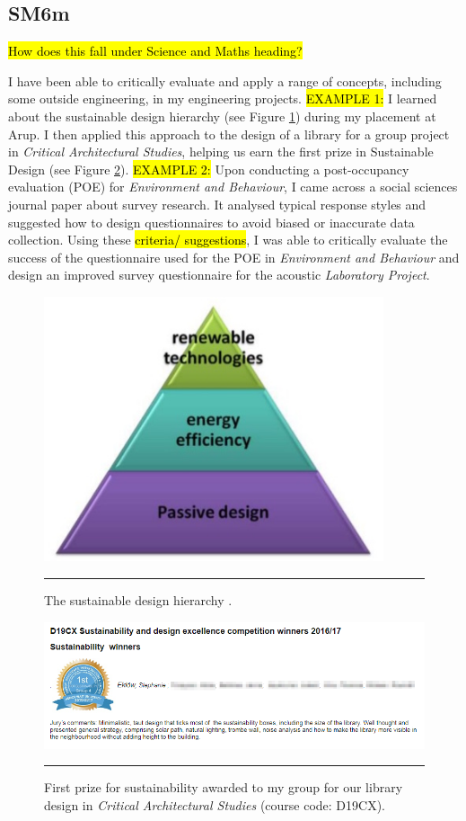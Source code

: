 \subsection*{SM6m}

\hl{How does this fall under Science and Maths heading?}

I have been able to critically evaluate and apply a range of concepts, including some outside engineering, in my engineering projects.
\hl{EXAMPLE 1:}
I learned about the sustainable design hierarchy (see Figure \ref{fig_hierarchy}) during my placement at Arup.
I then applied this approach to the design of a library for a group project in \textit{Critical Architectural Studies}, helping us earn the first prize in Sustainable Design (see Figure \ref{fig_award}).
\hl{EXAMPLE 2:}
Upon conducting a post-occupancy evaluation (POE) for \textit{Environment and Behaviour}, I came across a social sciences journal paper about survey research.
It analysed typical response styles and suggested how to design questionnaires to avoid biased or inaccurate data collection.
Using these \hl{criteria/ suggestions}, I was able to critically evaluate the success of the questionnaire used for the POE in \textit{Environment and Behaviour} and design an improved survey questionnaire for the acoustic \textit{Laboratory Project}.

\begin{figure}[htbp]
	\centering
	\includegraphics[width=10cm]{figures/Hierarchy.jpg}
	\rule{\textwidth}{0.5pt} %
	\caption{The sustainable design hierarchy \citep{Dougherty:online}.}
	\label{fig_hierarchy}
\end{figure}


\begin{figure}[htbp]
	\centering
	\includegraphics[width=\textwidth]{figures/SustainabilityAward.png}
	\rule{\textwidth}{0.5pt} %
	\caption{First prize for sustainability awarded to my group for our library design in \textit{Critical Architectural Studies} (course code: D19CX).}
	\label{fig_award}
\end{figure}

